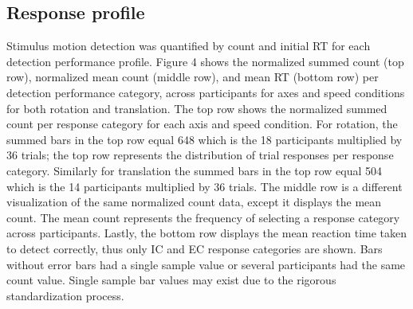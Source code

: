 \documentclass[11pt, onecolumn]{article}
\begin{document}
\subsection{Response profile}
Stimulus motion detection was quantified by count and initial RT for each detection performance profile.  Figure 4 shows the normalized summed count (top row), normalized mean count (middle row), and mean RT (bottom row) per detection performance category, across participants for axes and speed conditions for both rotation and translation.  The top row shows the normalized summed count per response category for each axis and speed condition. For rotation, the summed bars in the top row equal 648 which is the 18 participants multiplied by 36 trials; the top row represents the distribution of trial responses per response category.  Similarly for translation the summed bars in the top row equal 504 which is the 14 participants multiplied by 36 trials.  The middle row is a different visualization of the same normalized count data, except it displays the mean count.  The mean count represents the frequency of selecting a response category across participants.  Lastly, the bottom row displays the mean reaction time taken to detect correctly, thus only IC and EC response categories are shown. Bars without error bars had a single sample value or several participants had the same count value.  Single sample bar values may exist due to the rigorous standardization process.

\end{document}
